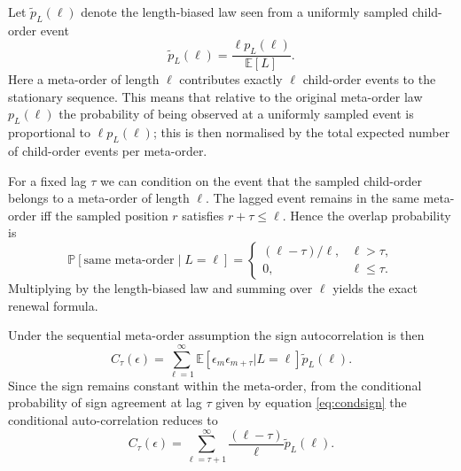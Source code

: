 \documentclass[5p,final]{elsarticle}
\newcommand{\E}{\mathbb{E}}
\begin{document}
Let $\widetilde p_L(\ell)$ denote the length-biased law seen from a uniformly sampled child-order event
\begin{equation}
\widetilde p_L(\ell)=\frac{\ell p_L(\ell)}{\mathbb E[L]}.
\label{eq:ellbiasedlaw}
\end{equation}
Here a meta-order of length $\ell$ contributes exactly $\ell$ child-order events to the stationary sequence. This means that relative to the original meta-order law $p_L(\ell)$ the probability of being observed at a uniformly sampled event is proportional to $\ell p_L(\ell)$; this is then normalised by the total expected number of child-order events per meta-order.

For a fixed lag $\tau$ we can condition on the event that the sampled child-order belongs to a meta-order of length $\ell$. The lagged event remains in the same meta-order iff the sampled position $r$ satisfies $r+\tau\le \ell$. Hence the overlap probability is
\begin{equation}
\mathbb P[\mbox{same meta-order} \mid L=\ell]=
\begin{cases}
(\ell-\tau)/\ell,&\ell>\tau,\\
0,&\ell\le\tau.
\end{cases} \label{eq:condsign}
\end{equation}
Multiplying by the length-biased law and summing over $\ell$ yields the exact renewal formula.

Under the sequential meta-order assumption the sign autocorrelation is then 
\begin{equation}
    C_\tau(\epsilon) = \sum_{\ell=1}^{\infty} \E[\epsilon_m \epsilon_{m+\tau} | L =\ell] \tilde p_L(\ell).
\end{equation}
Since the sign remains constant within the meta-order, from the conditional probability of sign agreement at lag $\tau$ given by equation \ref{eq:condsign} the conditional auto-correlation reduces to
\begin{equation}
    C_\tau(\epsilon) = \sum_{\ell=\tau+1}^{\infty} \frac{(\ell-\tau)}{\ell} \tilde p_L(\ell).
\end{equation}
\end{document}
